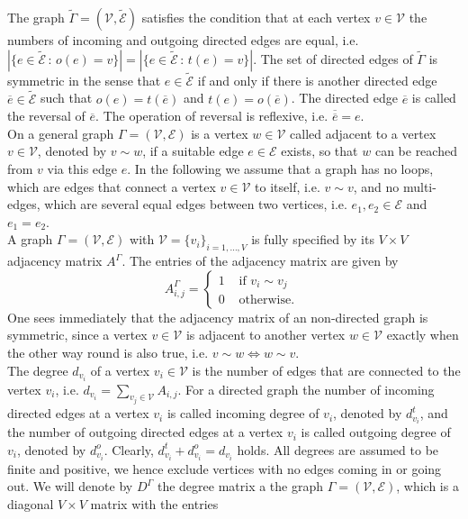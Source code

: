 The graph $\widetilde{\Gamma} = (\mathcal{V}, \widetilde{\mathcal{E}})$ satisfies the condition that at each vertex $v \in \mathcal{V}$ the numbers of incoming and outgoing directed edges are equal, i.e. $\left\lvert \{ e \in \widetilde{\mathcal{E}} \, \colon \, o(e) = v \} \right\rvert = \left\lvert \{ e \in \widetilde{\mathcal{E}} \, \colon \, t(e) = v \} \right\rvert$. The set of directed edges of $\widetilde{\Gamma}$ is symmetric in the sense that $e \in \widetilde{\mathcal{E}}$ if and only if there is another directed edge $\overline{e} \in \widetilde{\mathcal{E}}$ such that $o(e) = t(\overline{e})$ and $t(e) = o(\overline{e})$. The directed edge $\overline{e}$ is called the reversal of $\overline{e}$. The operation of reversal is reflexive, i.e. $\overline{\overline{e}} = e$. \\
On a general graph $\Gamma = (\mathcal{V}, \mathcal{E})$ is a vertex $w \in \mathcal{V}$ called adjacent to a vertex $v \in \mathcal{V}$, denoted by $v \sim w$, if a suitable edge $e \in \mathcal{E}$ exists, so that $w$ can be reached from $v$ via this edge $e$. In the following we assume that a graph has no loops, which are edges that connect a vertex $v \in \mathcal{V}$ to itself, i.e. $v \sim v$, and no multi-edges, which are several equal edges between two vertices, i.e. $e_1, e_2 \in \mathcal{E}$ and $e_1 = e_2$. \\
A graph $\Gamma = (\mathcal{V}, \mathcal{E})$ with $\mathcal{V} = \{v_i\}_{i = 1, \ldots, V}$ is fully specified by its $V \times V$ adjacency matrix $A^{\Gamma}$. The entries of the adjacency matrix are given by
\begin{equation}
    \label{adjacency matrix}
    A^{\Gamma}_{i, j}= \begin{cases} 1 & \text { if } v_i \sim v_j \\ 0 & \text { otherwise. } \end{cases}
\end{equation}
One sees immediately that the adjacency matrix of an non-directed graph is symmetric, since a vertex $v \in \mathcal{V}$ is adjacent to another vertex $w \in \mathcal{V}$ exactly when the other way round is also true, i.e. $v \sim w \Leftrightarrow w \sim v$. \\
The degree $d_{v_i}$ of a vertex $v_i \in \mathcal{V}$ is the number of edges that are connected to the vertex $v_i$, i.e. $d_{v_i} = \sum_{v_j \in \mathcal{V}} A_{i, j}$. For a directed graph the number of incoming directed edges at a vertex $v_i$ is called incoming degree of $v_i$, denoted by $d^{t}_{v_i}$, and the number of outgoing directed edges at a vertex $v_i$ is called outgoing degree of $v_i$, denoted by $d^{o}_{v_i}$. Clearly, $d^{t}_{v_i} + d^{o}_{v_i} = d_{v_i}$ holds. All degrees are assumed to be finite and positive, we hence exclude vertices with no edges coming in or going out. We will denote by $D^{\Gamma}$ the degree matrix a the graph $\Gamma = (\mathcal{V}, \mathcal{E})$, which is a diagonal $V \times V$ matrix with the entries
